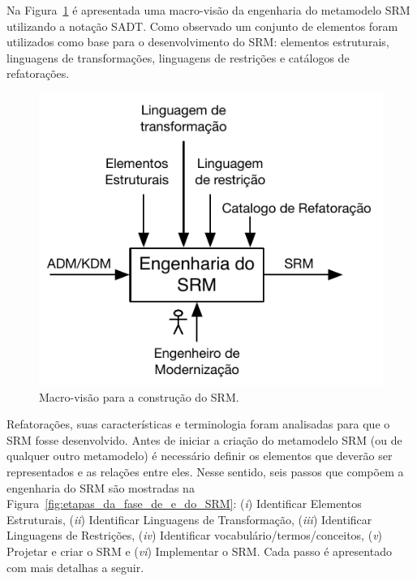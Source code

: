 Na Figura~\ref{fig:fases_para_a_construcao_e_uso_do_SRM} é apresentada uma macro-visão da engenharia do metamodelo SRM utilizando a notação SADT. Como observado um conjunto de elementos foram utilizados como base para o desenvolvimento do SRM: elementos estruturais, linguagens de transformações, linguagens de restrições e catálogos de refatorações. %

\begin{figure}[h]
	\centering
	\caption{Macro-visão para a construção do SRM.}
	\label{fig:fases_para_a_construcao_e_uso_do_SRM}
	\includegraphics[scale=0.9]{images/engenhariaDoSRM2}
	\fautor
\end{figure}


Refatorações, suas características e terminologia foram analisadas para que o SRM fosse desenvolvido. Antes de iniciar a criação do metamodelo SRM (ou de qualquer outro metamodelo) é necessário definir os elementos que deverão ser representados e as relações entre eles. Nesse sentido, seis passos que compõem a engenharia do SRM são mostradas na Figura~\ref{fig:etapas_da_fase_de_e_do_SRM}: (\textit{i}) Identificar Elementos Estruturais, (\textit{ii}) Identificar Linguagens de Transformação, (\textit{iii}) Identificar Linguagens de Restrições, (\textit{iv}) Identificar vocabulário/termos/conceitos, (\textit{v}) Projetar e criar o SRM e (\textit{vi}) Implementar o SRM. Cada passo é apresentado com mais detalhas a seguir.

